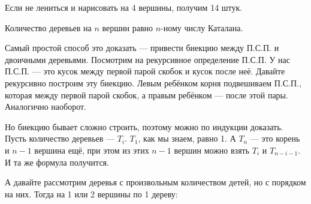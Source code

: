 \documentclass{article}
\begin{document}
\begin{itemize}
\begin{Comment}
\begin{center}
                \hspace{10px}
            \end{center}
            Если не лениться и нарисовать на 4 вершины, получим 14 штук.
        \end{Comment}
        \thm Количество деревьев на $n$ вершин равно $n$-ному числу Каталана.
        \begin{Proof}
            Самый простой способ это доказать --- привести биекцию между П.С.П. и двоичными деревьями. Посмотрим на рекурсивное определение П.С.П. У нас П.С.П. --- это кусок между первой парой скобок и кусок после неё. Давайте рекурсивно построим эту биекцию. Левым ребёнком корня подвешиваем П.С.П., которая между первой парой скобок, а правым ребёнком --- после этой пары. Аналогично наоборот.
        \end{Proof}
        \begin{Proof}
            Но биекцию бывает сложно строить, поэтому можно по индукции доказать. Пусть количество деревьев --- $T_i$. $T_1$, как мы знаем, равно 1. А $T_n$ --- это корень и $n-1$ вершина ещё, при этом из этих $n-1$ вершин можно взять $T_i$ и $T_{n-i-1}$. И та же формула получится.
        \end{Proof}
        \begin{Comment}
            А давайте рассмотрим деревья с произвольным количеством детей, но с порядком на них. Тогда на 1 или 2 вершины по 1 дереву:
            \begin{center}
                \hspace{15px}
\end{center}
\end{Comment}
\end{itemize}
\end{document}

